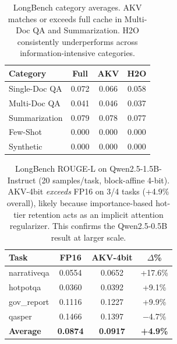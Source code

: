 \documentclass[11pt,a4paper]{article}
\begin{document}
\begin{table}[h]
\centering
\begin{tabular}{lccc}
\toprule
\textbf{Category} & \textbf{Full} & \textbf{AKV} & \textbf{H2O} \\
\midrule
Single-Doc QA & 0.072 & 0.066 & 0.058 \\
Multi-Doc QA & 0.041 & 0.046 & 0.037 \\
Summarization & 0.079 & 0.078 & 0.077 \\
Few-Shot & 0.000 & 0.000 & 0.000 \\
Synthetic & 0.000 & 0.000 & 0.000 \\
\bottomrule
\end{tabular}
\caption{LongBench category averages. AKV matches or exceeds full cache in Multi-Doc QA and Summarization. H2O consistently underperforms across information-intensive categories.}
\label{tab:longbench_cat}
\end{table}

\begin{table}[h]
\centering
\begin{tabular}{lccc}
\toprule
\textbf{Task} & \textbf{FP16} & \textbf{AKV-4bit} & \textbf{$\Delta$\%} \\
\midrule
narrativeqa & 0.0554 & 0.0652 & +17.6\% \\
hotpotqa & 0.0360 & 0.0392 & +9.1\% \\
gov\_report & 0.1116 & 0.1227 & +9.9\% \\
qasper & 0.1466 & 0.1397 & $-$4.7\% \\
\midrule
\textbf{Average} & \textbf{0.0874} & \textbf{0.0917} & \textbf{+4.9\%} \\
\bottomrule
\end{tabular}
\caption{LongBench ROUGE-L on Qwen2.5-1.5B-Instruct (20 samples/task, block-affine 4-bit). AKV-4bit \textit{exceeds} FP16 on 3/4 tasks (+4.9\% overall), likely because importance-based hot-tier retention acts as an implicit attention regularizer. This confirms the Qwen2.5-0.5B result at larger scale.}
\label{tab:longbench_1_5b}
\end{table}
\end{document}
